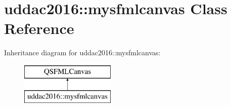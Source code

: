 \hypertarget{classuddac2016_1_1mysfmlcanvas}{\section{uddac2016\-:\-:mysfmlcanvas Class Reference}
\label{classuddac2016_1_1mysfmlcanvas}
}
Inheritance diagram for uddac2016\-:\-:mysfmlcanvas\-:\begin{figure}[H]
\begin{center}
\leavevmode
\includegraphics[height=2.000000cm]{classuddac2016_1_1mysfmlcanvas}
\end{center}
\end{figure}
